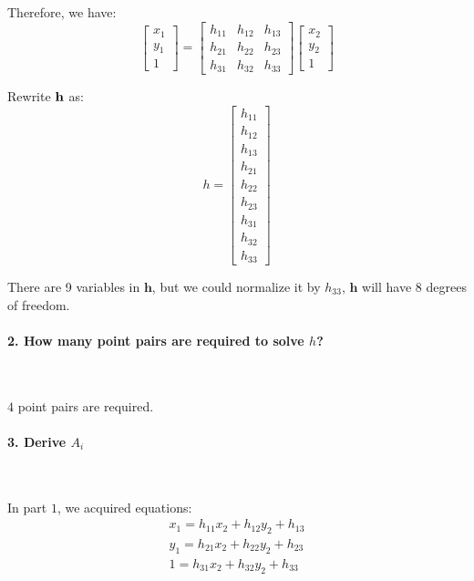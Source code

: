 \documentclass[11pt]{article} \usepackage{fullpage} \usepackage{graphicx} \usepackage{epstopdf} \usepackage{color} \usepackage{psfrag} \usepackage{pdfsync}\usepackage{indentfirst}\usepackage{subfigure}\usepackage{float}\usepackage[section]{placeins}
\begin{document}
Therefore, we have:
\begin{equation}
	\begin{bmatrix}
	x_1 \\ y_1 \\ 1
	\end{bmatrix} = 
	\begin{bmatrix}
	h_{11} & h_{12} & h_{13} \\
	h_{21} & h_{22} & h_{23} \\
	h_{31} & h_{32} & h_{33}
	\end{bmatrix}
	\begin{bmatrix}
	x_2 \\ y_2 \\ 1
	\end{bmatrix}
\end{equation}

Rewrite $\bold{h}$ as:
\begin{equation}
	h = 
	\begin{bmatrix}
		h_{11} \\ h_{12} \\ h_{13} \\ h_{21} \\ h_{22} \\ h_{23} \\ h_{31} \\ h_{32} \\ h_{33}
	\end{bmatrix}
\end{equation}

There are 9 variables in $\boldsymbol{h}$, but we could normalize it by $h_{33}$, $\boldsymbol{h}$ will have 8 degrees of freedom.

\paragraph{2. How many point pairs are required to solve $h$?}~{}

$4$ point pairs are required.

\paragraph{3. Derive $A_i$}~{}

In part $1$, we acquired equations:
\begin{align}
	x_1 = h_{11}x_2 + h_{12}y_2 + h_{13} \\
	y_1 = h_{21}x_2 + h_{22}y_2 + h_{23} \\
	1 = h_{31}x_2 + h_{32}y_2 + h_{33}
\end{align}
\end{document}
